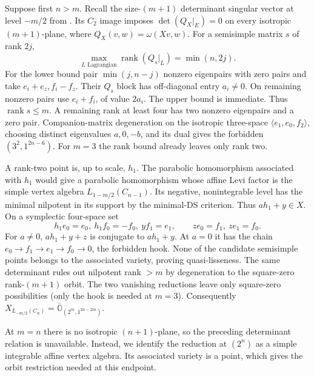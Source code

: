 \documentclass[11pt,a4paper]{amsart}
\numberwithin{equation}{section}
\theoremstyle{definition}
\theoremstyle{remark}
\newcommand{\clO}[1]{\overline{\mathbb O}_{(#1)}}
\newcommand{\rank}{\operatorname{rank}}
\begin{document}
Suppose first $n>m$. Recall the size-$(m+1)$ determinant singular
vector at level $-m/2$ from \cite[Theorem~4.1]{Adamovic2003}. Its
$C_2$ image imposes
$\det(Q_X|_E)=0$ on every isotropic $(m+1)$-plane, where
$Q_X(v,w)=\omega(Xv,w)$. For a semisimple matrix $s$ of rank $2j$,
\begin{equation}\label{seed:C-rank}
 \max_{L\text{ Lagrangian}}\rank(Q_s|_L)=\min(n,2j).
\end{equation}
For the lower bound pair $\min(j,n-j)$ nonzero eigenpairs with zero
pairs and take $e_i+e_z,f_i-f_z$. Their $Q_s$ block has off-diagonal
entry $a_i\ne0$. On remaining nonzero pairs use $e_i+f_i$, of value
$2a_i$. The upper bound is immediate. Thus $\rank s\le m$.
A remaining rank at least four has two nonzero eigenpairs and a zero
pair. Companion-matrix degeneration on the isotropic three-space
$\langle e_1,e_0,f_2\rangle$, choosing distinct eigenvalues $a,0,-b$,
and its dual gives the forbidden $(3^2,1^{2n-6})$. For $m=3$ the
rank bound already leaves only rank two.

A rank-two point is, up to scale, $h_1$. The parabolic homomorphism associated with $h_1$
would give a parabolic homomorphism whose affine Levi factor is the simple
vertex algebra $L_{1-m/2}(C_{n-1})$. Its negative,
nonintegrable level has the minimal nilpotent in its support by the
minimal-DS criterion. Thus $ah_1+y\in X$. On a symplectic four-space
set
$$
 h_1e_0=e_0,\ h_1f_0=-f_0,\ yf_1=e_1,
 \qquad ze_0=f_1,\ ze_1=f_0.
$$
For $a\ne0$, $ah_1+y+z$ is conjugate to $ah_1+y$. At $a=0$ it has
the chain $e_0\to f_1\to e_1\to f_0\to0$, the forbidden hook.
None of the candidate semisimple points belongs to the associated
variety, proving quasi-lisseness. The same determinant rules out
nilpotent rank $>m$ by degeneration to the square-zero rank-$(m+1)$
orbit. The two vanishing reductions leave only square-zero possibilities
(only the hook is needed at $m=3$).
Consequently $X_{L_{-m/2}(C_n)}=\clO{2^m,1^{2n-2m}}$.

At $m=n$ there is no isotropic $(n+1)$-plane, so the preceding
determinant relation is unavailable. Instead, we identify the
reduction at $(2^n)$ as a simple integrable affine vertex algebra.
Its associated variety is a point, which gives the orbit
restriction needed at this endpoint.
\end{document}
